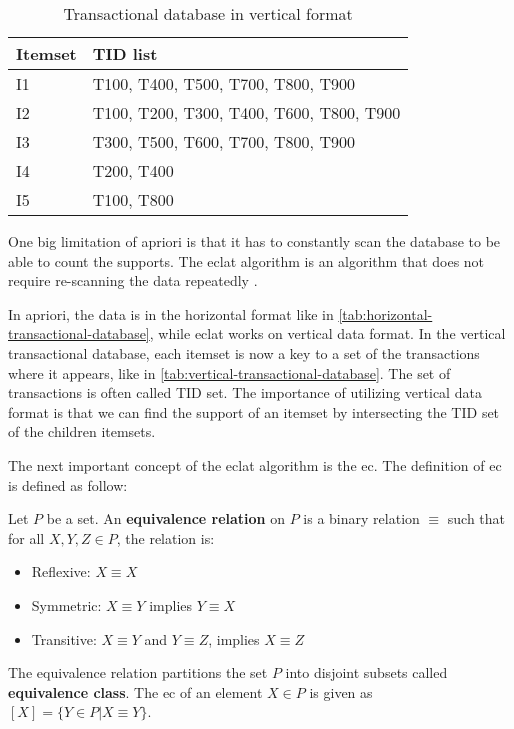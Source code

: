 \begin{table}[]
    \centering
    \begin{tabular}{|l|l|}
    \hline
    Itemset & TID list                                 \\ \hline
    I1      & T100, T400, T500, T700, T800, T900       \\ \hline
    I2      & T100, T200, T300, T400, T600, T800, T900 \\ \hline
    I3      & T300, T500, T600, T700, T800, T900       \\ \hline
    I4      & T200, T400                               \\ \hline
    I5      & T100, T800                               \\ \hline
    \end{tabular}
    \caption{Transactional database in vertical format \citep{han2012mining}}
    \label{tab:vertical-transactional-database}
\end{table}

One big limitation of \acl*{apriori} is that it has to constantly scan the database to be able to count the supports.
The \ac{eclat} algorithm is an algorithm that does not require re-scanning the data repeatedly \citep{zaki1997}.

In \acl{apriori}, the data is in the horizontal format like in \autoref{tab:horizontal-transactional-database}, while \ac{eclat} works on vertical data format.
In the vertical transactional database, each itemset is now a key to a set of the transactions where it appears, like in \autoref{tab:vertical-transactional-database}.
The set of transactions is often called \ac{TID} set.
The importance of utilizing vertical data format is that we can find the support of an itemset by intersecting the \ac{TID} set of the children itemsets.

The next important concept of the \ac{eclat} algorithm is the \ac{ec}. The definition of \acl{ec} is defined as follow:

\begin{definition}
    Let $P$ be a set. An \textbf{equivalence relation} on $P$ is a binary relation $\equiv$ such that for all $X, Y, Z \in P$, the relation is:
    \begin{itemize}
        \item Reflexive: $X \equiv X$
        \item Symmetric: $X \equiv Y$ implies $Y \equiv X$
        \item Transitive: $X \equiv Y$ and $Y \equiv Z$, implies $X \equiv Z$
    \end{itemize}
    The equivalence relation partitions the set $P$ into disjoint subsets called \textbf{equivalence class}. The \ac{ec} of an element $X \in P$ is given as $[X] = \{ Y \in P | X \equiv Y \}$.
\end{definition}

